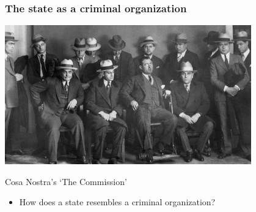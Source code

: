 \documentclass[aspectratio=43]{beamer}
\begin{document}
\begin{frame}
\frametitle{The state as a criminal organization}
\centering

\includegraphics[width = 0.8\textwidth]{img/cosa_nostra}

{\small Cosa Nostra's `The Commission'}

\vspace{20pt}

\begin{itemize}
  \item How does a state resembles a criminal organization?
\end{itemize}

\end{frame}

%
%
\end{document}
